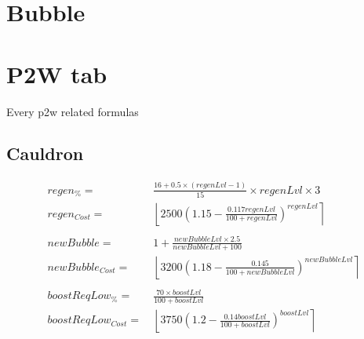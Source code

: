     \newpage
    \section{Bubble}
        \todo{}

    \newpage
    \section{P2W tab}\label{sec:p2w}
        Every p2w related formulas
        \subsection{Cauldron}
            \begin{align*}
                regen_\% = &\ \frac{16 + 0.5 \times (regenLvl-1)}{15} \times regenLvl \times 3
                \\ 
                regen_{Cost} = &\ 
                    \left\lfloor 
                        2500\left(1.15-\frac{0.117regenLvl}{100+regenLvl}\right)^{regenLvl}
                    \right\rceil 
                \\ 
                \\
                newBubble = &\ 1 + \frac{newBubbleLvl \times 2.5}{newBubbleLvl + 100}
                \\
                newBubble_{Cost} = &\ 
                    \left\lfloor 
                        3200\left(1.18-\frac{0.145}{100+newBubbleLvl}\right)^{newBubbleLvl}
                    \right\rceil 
                \\
                \\
                boostReqLow_\% = &\  \frac{70 \times boostLvl}{100+boostLvl}
                \\
                boostReqLow_{Cost} = &\ 
                    \left\lfloor 
                        3750\left(1.2-\frac{0.14boostLvl}{100+boostLvl}\right)^{boostLvl}
                    \right\rceil 
            \end{align*}
